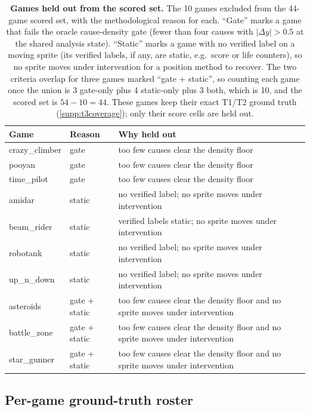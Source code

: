\begin{table}[t]
\centering
\caption{\textbf{Games held out from the scored set.} The 10 games excluded from the
44-game scored set, with the methodological reason for each. ``Gate'' marks a
game that fails the oracle cause-density gate (fewer than four causes with $|\Delta y|>0.5$ at
the shared analysis state). ``Static'' marks a game with no verified label on a moving sprite (its verified labels, if any, are static,
e.g.\ score or life counters), so no sprite moves under intervention for a position method to
recover. The two criteria overlap for three games marked ``gate + static'', so counting each
game once the union is 3 gate-only plus 4 static-only plus 3 both, which is 10, and the scored
set is $54-10=44$. These games keep their exact T1/T2 ground truth
(\Sectionname\ref{supp:t3coverage}); only their score cells are held out.}
\label{supp:tab:scoredset}
\footnotesize
\setlength{\tabcolsep}{6pt}
\begin{tabular}{@{}p{2.6cm}p{1.6cm}p{6.0cm}@{}}
\toprule
Game & Reason & Why held out \\
\midrule
crazy\_climber & gate & too few causes clear the density floor \\
pooyan & gate & too few causes clear the density floor \\
time\_pilot & gate & too few causes clear the density floor \\
\midrule
amidar & static & no verified label; no sprite moves under intervention \\
beam\_rider & static & verified labels static; no sprite moves under intervention \\
robotank & static & no verified label; no sprite moves under intervention \\
up\_n\_down & static & no verified label; no sprite moves under intervention \\
\midrule
asteroids & gate + static & too few causes clear the density floor and no sprite moves under intervention \\
battle\_zone & gate + static & too few causes clear the density floor and no sprite moves under intervention \\
star\_gunner & gate + static & too few causes clear the density floor and no sprite moves under intervention \\
\bottomrule
\end{tabular}
\end{table}

\subsection{Per-game ground-truth roster}\label{supp:romrostersec}

